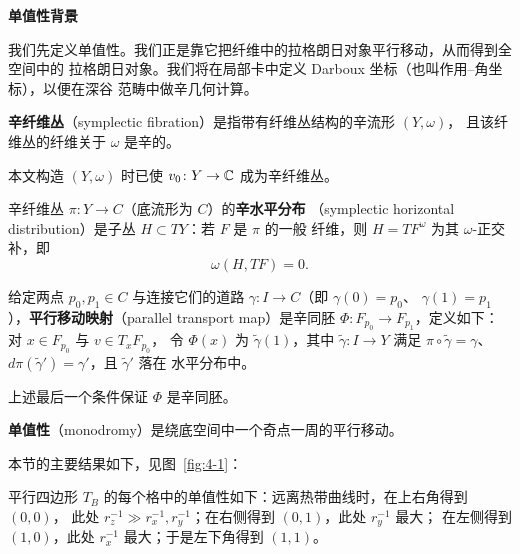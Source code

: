 
\medskip\noindent\textbf{单值性背景}\par
我们先定义单值性。我们正是靠它把纤维中的拉格朗日对象平行移动，从而得到全空间中的
拉格朗日对象。我们将在局部卡中定义 Darboux 坐标（也叫作用--角坐标），以便在深谷
范畴中做辛几何计算。

\begin{definition}\label{def:4-1-5}
\textbf{辛纤维丛}（symplectic fibration）是指带有纤维丛结构的辛流形 $(Y,\omega)$，
且该纤维丛的纤维关于 $\omega$ 是辛的。
\end{definition}

\begin{example}\label{ex:4-1-6}
本文构造 $(Y,\omega)$ 时已使 $v_0\colon Y\to\mathbb{C}$ 成为辛纤维丛。
\end{example}

\begin{definition}\label{def:4-1-7}
辛纤维丛 $\pi\colon Y\to C$（底流形为 $C$）的\textbf{辛水平分布}
（symplectic horizontal distribution）是子丛 $H\subset TY$：若 $F$ 是 $\pi$ 的一般
纤维，则 $H=TF^{\omega}$ 为其 $\omega$-正交补，即
\[
\omega(H,TF)=0.
\]
\end{definition}

\begin{definition}\label{def:4-1-8}
给定两点 $p_0,p_1\in C$ 与连接它们的道路 $\gamma\colon I\to C$（即 $\gamma(0)=p_0$、
$\gamma(1)=p_1$），\textbf{平行移动映射}（parallel transport map）是辛同胚
$\Phi\colon F_{p_0}\to F_{p_1}$，定义如下：对 $x\in F_{p_0}$ 与 $v\in T_xF_{p_0}$，
令 $\Phi(x)$ 为 $\tilde\gamma(1)$，其中 $\tilde\gamma\colon I\to Y$ 满足
$\pi\circ\tilde\gamma=\gamma$、$d\pi(\tilde\gamma')=\gamma'$，且 $\tilde\gamma'$ 落在
水平分布中。
\end{definition}

\begin{remark}\label{rem:4-1-9}
上述最后一个条件保证 $\Phi$ 是辛同胚。
\end{remark}

\begin{definition}\label{def:4-1-10}
\textbf{单值性}（monodromy）是绕底空间中一个奇点一周的平行移动。
\end{definition}

本节的主要结果如下，见图~\ref{fig:4-1}：

\begin{lemma}\label{lem:4-1-11}
平行四边形 $T_B$ 的每个格中的单值性如下：远离热带曲线时，在上右角得到 $(0,0)$，
此处 $r_z^{-1}\gg r_x^{-1},r_y^{-1}$；在右侧得到 $(0,1)$，此处 $r_y^{-1}$ 最大；
在左侧得到 $(1,0)$，此处 $r_x^{-1}$ 最大；于是左下角得到 $(1,1)$。
\end{lemma}

